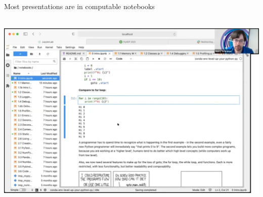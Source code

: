 \documentclass[aspectratio=169]{beamer}
\begin{document}
\begin{frame}{Most presentations are in computable notebooks}
\vspace{0.25 cm}

\mbox{ } \hfill \includegraphics[width=0.85\linewidth]{PLOTS/pyhep-2018-notebook-screenshot.png} \hfill \mbox{ }
\end{frame}
\end{document}
